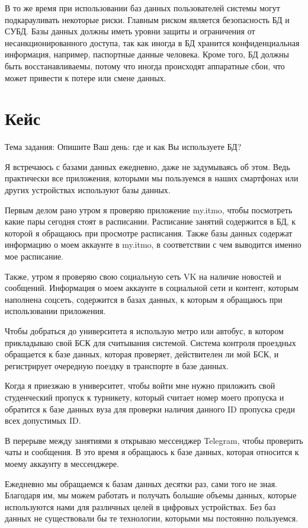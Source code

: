 \documentclass[14pt]{extreport}
\begin{document}
В то же время при использовании баз данных пользователей системы могут подкарауливать некоторые риски. Главным риском является безопасность БД и СУБД. Базы данных должны иметь уровни защиты и ограничения от несанкционированного доступа, так как иногда в БД хранится конфиденциальная информация, например, паспортные данные человека. Кроме того, БД должны быть восстанавливаемы, потому что иногда происходят аппаратные сбои, что может привести к потере или смене данных.

\section{Кейс}

Тема задания: Опишите Ваш день: где и как Вы используете БД? 

Я встречаюсь с базами данных ежедневно, даже не задумываясь об этом. Ведь практически все приложения, которыми мы пользуемся в наших смартфонах или других устройствах используют базы данных.

Первым делом рано утром я проверяю приложение my.itmo, чтобы посмотреть какие пары сегодня стоят в расписании. Расписание занятий содержится в БД, к которой я обращаюсь при просмотре расписания. Также базы данных содержат информацию о моем аккаунте в my.itmo, в соответствии с чем выводится именно мое расписание.

Также, утром я проверяю свою социальную сеть VK на наличие новостей и сообщений. Информация о моем аккаунте в социальной сети и контент, которым наполнена соцсеть, содержится в базах данных, к которым я обращаюсь при использовании приложения.

Чтобы добраться до университета я использую метро или автобус, в котором прикладываю свой БСК для считывания системой. Система контроля проездных обращается к базе данных, которая проверяет, действителен ли мой БСК, и регистрирует очередную поездку в транспорте в базе данных.

Когда я приезжаю в университет, чтобы войти мне нужно приложить свой студенческий пропуск к турникету, который считает номер моего пропуска и обратится к базе данных вуза для проверки наличия данного ID пропуска среди всех допустимых ID.

В перерыве между занятиями я открываю мессенджер Telegram, чтобы проверить чаты и сообщения. В это время я обращаюсь к базе данных, которая относится к моему аккаунту в мессенджере.

Ежедневно мы обращаемся к базам данных десятки раз, сами того не зная. Благодаря им, мы можем работать и получать большие объемы данных, которые используются нами для различных целей в цифровых устройствах. Без баз данных не существовали бы те технологии, которыми мы постоянно пользуемся.
\end{document}
